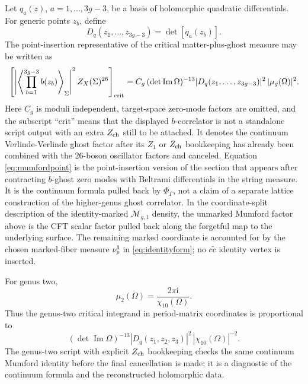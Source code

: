 \documentclass[11pt]{article}
\numberwithin{equation}{section}
\newcommand{\cM}{\mathcal M}
\newcommand{\ii}{\mathrm i}
\newcommand{\im}{\operatorname{Im}}
\begin{document}
Let \(q_a(z)\), \(a=1,\ldots,3g-3\), be a basis of holomorphic quadratic
differentials.  For generic points \(z_b\), define
\begin{equation}
        D_q(z_1,\ldots,z_{3g-3})=\det[q_a(z_b)].
\end{equation}
The point-insertion representative of the critical matter-plus-ghost measure may
be written as
\begin{equation}
        \left[
        \left|
        \left\langle \prod_{b=1}^{3g-3} b(z_b)\right\rangle_{\Sigma}
        \right|^2 Z_X(\Sigma)^{26}
        \right]_{\rm crit}
        =
        C_g\,(\det\im\Omega)^{-13}
        |D_q(z_1,\ldots,z_{3g-3})|^2\,|\mu_g(\Omega)|^2.
        \label{eq:mumfordpoint}
\end{equation}
Here \(C_g\) is moduli independent, target-space zero-mode factors are omitted,
and the subscript ``crit'' means that the displayed \(b\)-correlator is not a
standalone script output with an extra \(Z_{\rm ch}\) still to be attached.
It denotes the continuum Verlinde-Verlinde ghost factor after its
\(Z_1\) or \(Z_{\rm ch}\) bookkeeping has already been combined with the
\(26\)-boson oscillator factors and canceled.  Equation
\eqref{eq:mumfordpoint} is the point-insertion version of the section that
appears after contracting \(b\)-ghost zero modes with Beltrami differentials in
the string measure.  It is the continuum formula pulled back by
\(\Phi_\Gamma\), not a claim of a separate lattice construction of the
higher-genus ghost correlator.
In the coordinate-split description of the identity-marked \(\cM_{g,1}\)
density, the unmarked Mumford factor above is the CFT scalar factor pulled back
along the forgetful map to the underlying surface.  The remaining marked
coordinate is accounted for by the chosen marked-fiber measure
\(\nu_p^{\mathbf 1}\) in \eqref{eq:identityform}; no \(c\widetilde c\)
identity vertex is inserted.

For genus two,
\begin{equation}
        \mu_2(\Omega)=\frac{2\pi\ii}{\chi_{10}(\Omega)}.
        \label{eq:mu2}
\end{equation}
Thus the genus-two critical integrand in period-matrix coordinates is
proportional to
\[
        (\det\im\Omega)^{-13}
        |D_q(z_1,z_2,z_3)|^2\,|\chi_{10}(\Omega)|^{-2}.
\]
The genus-two script with explicit \(Z_{\rm ch}\) bookkeeping checks the same
continuum Mumford identity before the final cancellation is made; it is a
diagnostic of the continuum formula and the reconstructed holomorphic data.
\end{document}
